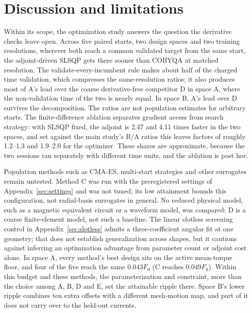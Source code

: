 \documentclass{anvil-paper}
\begin{document}
\section{Discussion and limitations}
Within its scope, the optimization study answers the question the
derivative checks leave open. Across five paired starts, two design spaces
and two training resolutions, wherever both reach a common validated target
from the same start, the adjoint-driven SLSQP gets there sooner than COBYQA
at matched resolution. The validate-every-incumbent rule makes about half
of the charged time validation, which compresses the same-resolution
ratios; it also produces most of A's lead over the coarse derivative-free
competitor D in space A, where the non-validation time of the two is
nearly equal. In space B, A's lead over D survives the decomposition. The
ratios are not population estimates for arbitrary starts. The
finite-difference ablation separates gradient access from search strategy:
with SLSQP fixed, the adjoint is 2.47 and 4.11 times faster in the two
spaces, and set against the main study's B/A ratios this leaves factors of
roughly 1.2--1.3 and 1.9--2.0 for the optimizer. These shares are
approximate, because the two sessions ran separately with different time
units, and the ablation is post hoc.

Population methods such as CMA-ES, multi-start strategies and other
surrogates remain untested. Method C was run with the preregistered
settings of Appendix~\ref{sec:settings} and was not tuned; its low
attainment bounds this configuration, not radial-basis surrogates in
general. No reduced physical model, such as a magnetic equivalent circuit
or a waveform model, was compared: D is a coarse finite-element model, not
such a baseline. The linear slotless screening control in
Appendix~\ref{sec:slotless} admits a three-coefficient angular fit at one
geometry; that does not establish generalization across shapes, but it
cautions against inferring an optimization advantage from parameter count
or adjoint cost alone. In space A, every method's best
design sits on the active mean-torque floor, and four of the five reach
the same $0.043F_0$ (C reaches $0.049F_0$). Within this budget and these
methods, the parameterization and constraint, more than the choice among
A, B, D and E, set the attainable ripple there. Space B's lower ripple
combines ten extra offsets with a different mesh-motion map, and part of
it does not carry over to the held-out currents.
\end{document}
